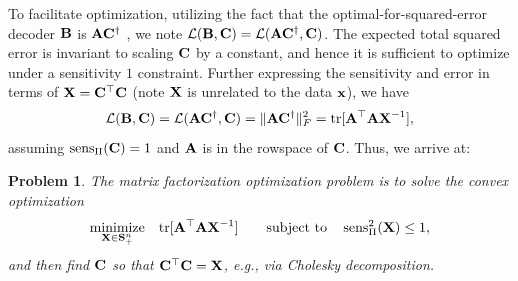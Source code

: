 \documentclass{article}
\newtheorem{definition}{Definition}
\newtheorem{problem}{Problem}
\begin{document}
To facilitate optimization, utilizing the fact that the optimal-for-squared-error decoder $\mathbf{B}$ is $\mathbf{A} \mathbf{C}^\dagger$ \citep{denisov22matfact}, we note $\mathcal{L}(\mathbf{B}, \mathbf{C}) 
= \mathcal{L}(\mathbf{A} \mathbf{C}^\dagger, \mathbf{C})$.
%
%
The expected total squared error is invariant to scaling $\mathbf{C}$  by a constant, and hence it is sufficient to optimize under a sensitivity $1$ constraint. Further expressing the sensitivity and error in terms of $\mathbf{X} = \mathbf{C}^\top \mathbf{C}$ (note $\mathbf{X}$ is unrelated to the data $\mathbf{x}$), we have
\begin{equation}
\mathcal{L}(\mathbf{B}, \mathbf{C}) 
= \mathcal{L}(\mathbf{A} \mathbf{C}^\dagger, \mathbf{C})
= \| \mathbf{A} \mathbf{C}^{\dagger} \|_F^2
= \mathrm{tr}[\mathbf{A}^\top \mathbf{A} \mathbf{X}^{-1}], 
\end{equation}
assuming $\operatorname{sens}_\Pi(\mathbf{C}) = 1$ and $\mathbf{A}$ is in the rowspace of $\mathbf{C}$. Thus, we arrive at: 


%
\begin{problem} \label{prob:optconvex}
The matrix factorization optimization problem is to solve the convex optimization
\begin{equation} \label{eq:optconvex}
\underset{\mathbf{X} \in \mathbf{S}^{n}_{+}}{\text{minimize}}
\quad
\mathrm{tr}[\mathbf{A}^\top \mathbf{A} \mathbf{X}^{-1}] 
\qquad
\text{subject to}
\quad
\operatorname{sens}_\Pi^2(\mathbf{X}) \leq 1,
\end{equation}
and then find $\mathbf{C}$ so that $\mathbf{C}^\top \mathbf{C} = \mathbf{X}$, e.g., via Cholesky decomposition.
\end{problem}
\vspace{-1em}
\end{document}
